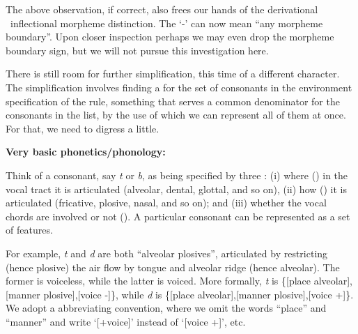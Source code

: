 \documentclass[11pt]{article}
\newcommand{\morphrule}[3]{{\it#1}\hspace{10pt}\sysm{\imp}\hspace{10pt}{\it#2}\hspace{10pt}/\hspace{10pt}{\it#3}}
\begin{document}
{\item The above observation, if correct, also frees our hands of the
derivational \versus\ inflectional morpheme distinction. The `-' can now mean
``any morpheme boundary''. Upon closer inspection perhaps we may even drop the
morpheme boundary sign, but we will not pursue this investigation here. 


% 
% 
% 

\item There is still room for further simplification, this time of a different
character. The simplification involves finding a  for the set of
consonants in the environment specification of the rule, something that serves a common
denominator for the consonants in the list, by the use of which we can represent
all of them at once. For that, we need to digress a little. 


\item[] {\bf Very basic phonetics/phonology:}

\item Think of a consonant, say \emph{t} or \emph{b}, as being specified by three
: (i) where () in the vocal tract it is articulated
(alveolar, dental, glottal, and so on), (ii) how () it is
articulated (fricative, plosive, nasal, and so on); and (iii) whether the vocal
chords are involved or not (). A particular consonant can be
represented as a set of features.

\item For example, \emph{t} and \emph{d} are both ``alveolar plosives'',
articulated by restricting (hence plosive) the air flow by tongue and alveolar
ridge (hence alveolar). The former is voiceless, while the latter is voiced.
More formally, \emph{t} is \{[place alveolar],[manner plosive],[voice -]\},
while \emph{d} is \{[place alveolar],[manner plosive],[voice +]\}. We adopt
a abbreviating convention, where we omit the words ``place'' and ``manner'' and
write `[+voice]' instead of `[voice +]', etc. 

}
\end{document}
